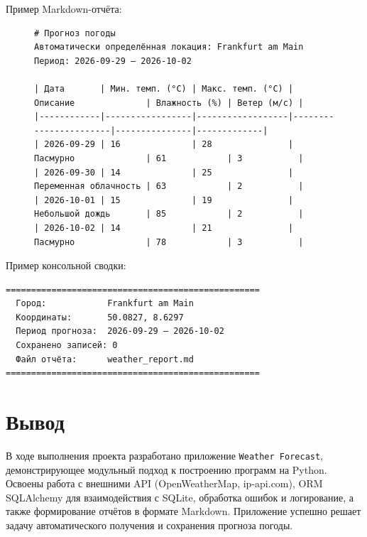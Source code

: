 \documentclass[11pt,a4paper]{article}
\begin{document}
Пример Markdown-отчёта:
\begin{figure}[!ht]
\centering
\begin{Verbatim}[fontsize=\fontsize{9}{7}\selectfont]
# Прогноз погоды
Автоматически определённая локация: Frankfurt am Main
Период: 2026-09-29 – 2026-10-02

| Дата       | Мин. темп. (°C) | Макс. темп. (°C) | Описание              | Влажность (%) | Ветер (м/с) |
|------------|-----------------|------------------|-----------------------|---------------|-------------|
| 2026-09-29 | 16              | 28               | Пасмурно              | 61            | 3           |
| 2026-09-30 | 14              | 25               | Переменная облачность | 63            | 2           |
| 2026-10-01 | 15              | 19               | Небольшой дождь       | 85            | 2           |
| 2026-10-02 | 14              | 21               | Пасмурно              | 78            | 3           |
\end{Verbatim}
\end{figure}

Пример консольной сводки:
\begin{verbatim}
==================================================
  Город:            Frankfurt am Main
  Координаты:       50.0827, 8.6297
  Период прогноза:  2026-09-29 – 2026-10-02
  Сохранено записей: 0
  Файл отчёта:      weather_report.md
==================================================
\end{verbatim}

\section*{\normalsize Вывод}

В ходе выполнения проекта разработано приложение \texttt{Weather Forecast}, демонстрирующее модульный подход к построению программ на Python. Освоены работа с внешними API (OpenWeatherMap, ip-api.com), ORM SQLAlchemy для взаимодействия с SQLite, обработка ошибок и логирование, а также формирование отчётов в формате Markdown. Приложение успешно решает задачу автоматического получения и сохранения прогноза погоды.
\end{document}
